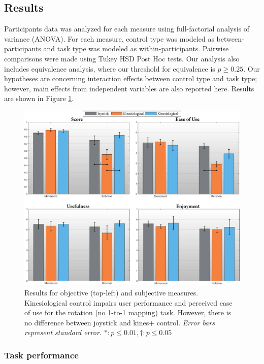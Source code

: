 \documentclass{sigchi}
\begin{document}

\subsection{Results}

Participants data was analyzed for each measure using full-factorial analysis of variance (ANOVA). For each measure, control type was modeled as between-participants and task type was modeled as within-participants. Pairwise comparisons were made using Tukey HSD Post Hoc tests. Our analysis also includes equivalence analysis, where our threshold for equivalence is $p\geq0.25$. Our hypotheses are concerning interaction effects between control type and task type; however, main effects from independent variables are also reported here. Results are shown in Figure \ref{fig:bar_chart}.

\begin{figure}[t]
	\centering
	\includegraphics[width=\columnwidth]{figures/bar_charts.pdf}
	\caption{Results for objective (top-left) and subjective measures. Kinesiological control impairs user performance and perceived ease of use for the rotation (no 1-to-1 mapping) task. However, there is no difference between joystick and kines+ control. \em{Error bars represent standard error.} $\ast: p \leq 0.01, \dagger:p \leq 0.05 $ }
	\label{fig:bar_chart}
\end{figure} 

\subsubsection{Task performance}
\end{document}
